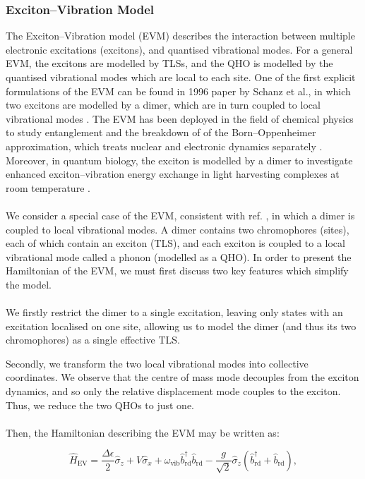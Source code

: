 \documentclass[11pt]{article}
\begin{document}
\subsubsection{Exciton--Vibration Model}  \label{sec:theory_subsub_EVM}
The Exciton--Vibration model (EVM) describes the interaction between multiple electronic excitations (excitons), and quantised vibrational modes. For a general EVM, the excitons are modelled by TLSs, and the QHO is modelled by the quantised vibrational modes which are local to each site. One of the first explicit formulations of the EVM can be found in 1996 paper by Schanz et al., in which two excitons are modelled by a dimer, which are in turn coupled to local vibrational modes \cite{ExVib1997-First}. The EVM has been deployed in the field of chemical physics to study entanglement and the breakdown of of the Born--Oppenheimer approximation, which treats nuclear and electronic dynamics separately \cite{ExVib2015-ChemPhysBorn}. Moreover, in quantum biology, the exciton is modelled by a dimer to investigate enhanced exciton--vibration energy exchange in light harvesting complexes at room temperature \cite{ExVib2014-Alexandra}.\\
\\
We consider a special case of the EVM, consistent with ref. \cite{ExVib2014-Alexandra}, in which a dimer is coupled to local vibrational modes. A dimer contains two chromophores (sites), each of which contain an exciton (TLS), and each exciton is coupled to a local vibrational mode called a phonon (modelled as a QHO). In order to present the Hamiltonian of the EVM, we must first discuss two key features which simplify the model.\\
\\
We firstly restrict the dimer to a single excitation, leaving only states with an excitation localised on one site, allowing us to model the dimer (and thus its two chromophores) as a single effective TLS.

Secondly, we transform the two local vibrational modes into collective coordinates. We observe that the centre of mass mode decouples from the exciton dynamics, and so only the relative displacement mode couples to the exciton. Thus, we reduce the two QHOs to just one.\\
\\
Then, the Hamiltonian describing the EVM may be written as:

\begin{equation} \label{eqn:H_EV}
    \hat{H}_{\scriptscriptstyle \text{EV}} = \frac{\Delta\epsilon}{2}\hat{\sigma}_z + V\hat{\sigma}_x + \omega_{\scriptscriptstyle \text{vib}} \hat{b}_{\scriptscriptstyle \text{rd}}^\dagger \hat{b}_{\scriptscriptstyle \text{rd}} -\frac{g}{\sqrt{2}}\hat{\sigma}_z\left(\hat{b}_{\scriptscriptstyle \text{rd}}^\dagger + \hat{b}_{\scriptscriptstyle \text{rd}}\right),
\end{equation}
\end{document}
